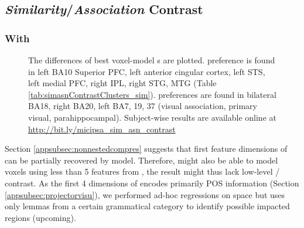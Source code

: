 \subsection{\emph{Similarity}/\emph{Association} Contrast}

\subsubsection{With }

\begin{figure}
    \centering
    \caption[- Contrast, Group]{The differences of best voxel-model s are plotted.  preference is found in left BA10 Superior PFC, left anterior cingular cortex, left STS, left medial PFC, right IPL, right STG, MTG (Table \ref{tab:simasnContrastClusters_sim}).  preferences are found in bilateral BA18, right BA20, left BA7, 19, 37 (visual association, primary visual, parahippocampal). Subject-wise results are available online at \url{http://bit.ly/micipsa_sim_asn_contrast}} 
    \label{fig:EMB_SIM_ASN_ContrastMapG}
\end{figure}



Section \ref{appsubsec:nonnestedcompres} suggests that first feature dimensions of  can be partially recovered by  model. Therefore,  might also be able to model voxels using less than 5 features from , the result might thus lack low-level / contrast. As the first 4 dimensions of  encodes primarily POS information (Section \ref{appsubsec:projectorvisu}), we performed ad-hoc regressions on  space but uses only lemmas from a certain grammatical category to identify possible impacted regions (upcoming). 

